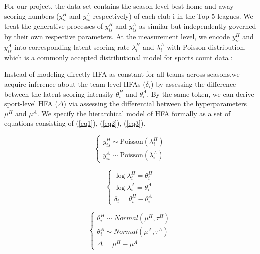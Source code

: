 \documentclass[]{interact}
\theoremstyle{plain}%
\theoremstyle{definition}
\theoremstyle{remark}
\begin{document}
For our project, the data set contains the season-level best home and away scoring numbers ($y^H_{is}$ and   $y^A_{is}$ respectively) of each club i in the Top 5 leagues. 
We treat the generative processes of $y^H_{is}$ and $y^A_{is}$ as similar but independently governed by their own respective parameters. At the measurement level, we encode $y^H_{is}$ and $y^A_{is}$ into corresponding latent scoring rate $\lambda^H_{i}$ and $\lambda^A_{i}$ with Poisson distribution, which is a commonly accepted distributional model for sports count data \citep{Miller2015}:

 Instead of modeling directly HFA as constant for all teams across seasons,we acquire inference about the team level HFAs ($\delta_i$) by assessing the difference between the latent scoring intensity $\theta^H_{i}$ and $\theta^A_i$. By the same token, we can derive sport-level HFA ($\Delta$) via assessing the differential between the hyperparameters  $\mu^H$ and $\mu^A$. We specify the hierarchical model of HFA formally as a set of equations consisting of (\ref{eq1}), (\ref{eq2}), (\ref{eq3}). 

\begin{equation}
\begin{cases}
y^H_{is} \sim \text{Poisson}(\lambda^H_{i})\\
y^A_{is} \sim \text{Poisson}(\lambda^A_{i})
\end{cases}
\label{eq1}
\end{equation}



\begin{equation}
\begin{cases}
\log\lambda^H_{i} = \theta^H_{i}\\  
\log\lambda^A_{i} = \theta^A_{i}\\
\delta_i = \theta^H_i - \theta^A_i
\end{cases}
\label{eq2}
\end{equation} 

\begin{equation}
\begin{cases}
\theta^H_i \sim Normal(\mu^H, \tau^H)\\
\theta^A_i \sim Normal(\mu^A, \tau^A)\\
\Delta = \mu^H - \mu^A
\end{cases}
\label{eq3}
\end{equation} 
\end{document}
